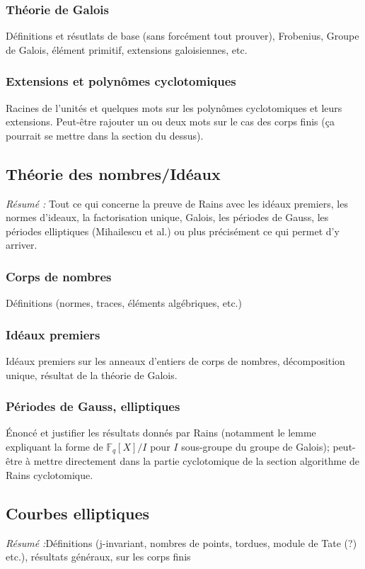 \documentclass[a4paper]{article} %
\numberwithin{equation}{section}
\newcommand\GF[1]{\mathbb{F}_{#1}}
\begin{document}
{\subsubsection{Théorie de Galois}
Définitions et résutlats de base (sans forcément tout prouver), Frobenius, 
Groupe de Galois, élément primitif, extensions galoisiennes, etc.

\subsubsection{Extensions et polynômes cyclotomiques}
Racines de l'unités et quelques mots sur les polynômes cyclotomiques et leurs 
extensions. Peut-être rajouter un ou deux mots sur le cas des corps finis (ça 
pourrait se mettre dans la section du dessus).

\subsection{Théorie des nombres/Idéaux}
\textit{Résumé :} Tout ce qui concerne la preuve de Rains avec les idéaux 
premiers, les normes d'ideaux, la factorisation unique, Galois, les périodes de 
Gauss, les périodes elliptiques (Mihailescu et al.) ou plus précisément ce qui 
permet d'y arriver.
\subsubsection{Corps de nombres}
Définitions (normes, traces, éléments algébriques, etc.)
\subsubsection{Idéaux premiers}
 Idéaux premiers sur les anneaux d'entiers de corps de nombres,
 décomposition unique, résultat de la théorie de Galois.
\subsubsection{Périodes de Gauss, elliptiques}
Énoncé et justifier les résultats donnés par Rains (notamment le lemme
expliquant la forme de $\GF{q}[X]/I$ pour $I$ sous-groupe du groupe de Galois);
peut-être à mettre directement dans la partie cyclotomique de la section
algorithme de Rains cyclotomique.

\subsection{Courbes elliptiques}
\textit{Résumé :}Définitions (j-invariant, nombres de points, tordues, module de
Tate (?) etc.), résultats généraux, sur les corps finis
}
\end{document}

